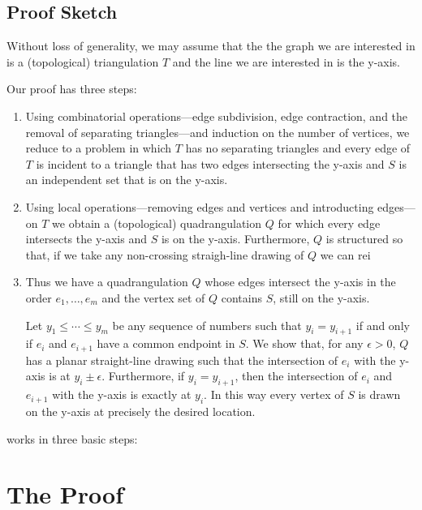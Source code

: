 \documentclass{patmorin}
\begin{document}
\subsection{Proof Sketch}


Without loss of generality, we may assume that the the graph we are
interested in is a (topological) triangulation $T$ and the line we are
interested in is the y-axis.

Our proof has three steps:
\begin{enumerate}
   \item Using combinatorial operations---edge subdivision, edge
   contraction, and the removal of separating triangles---and induction
   on the number of vertices, we reduce to a problem in which $T$
   has no separating triangles and every edge of $T$ is incident to a
   triangle that has two edges intersecting the y-axis and $S$ is an
   independent set that is on the y-axis.

   \item Using local operations---removing edges and vertices and
   introducting edges---on $T$ we obtain a (topological) quadrangulation
   $Q$ for which every edge intersects the y-axis and $S$ is on the
   y-axis.  Furthermore, $Q$ is structured so that, if we take any
   non-crossing straigh-line drawing of $Q$ we can rei

   \item Thus we have a quadrangulation $Q$ whose edges intersect
   the y-axis in the order $e_1,\ldots,e_m$ and the vertex set of $Q$
   contains $S$, still on the y-axis.

   Let $y_1\le\cdots\le y_m$ be any sequence of numbers such that
   $y_i=y_{i+1}$ if and only if $e_i$ and $e_{i+1}$ have a common endpoint
   in $S$.  We show that, for any $\epsilon >0$, $Q$ has a planar
   straight-line drawing such that the intersection of $e_i$ with the
   y-axis is at $y_i\pm\epsilon$.  Furthermore, if $y_i=y_{i+1}$, then
   the intersection of $e_i$ and $e_{i+1}$ with the y-axis is exactly
   at $y_i$. In this way every vertex of $S$ is drawn on the y-axis
   at precisely the desired location.
\end{enumerate}


works in three basic steps: 



\section{The Proof}
\end{document}
